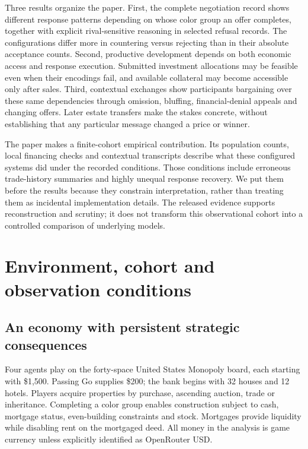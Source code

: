 Three results organize the paper. First, the complete negotiation record shows different response patterns depending on whose color group an offer completes, together with explicit rival-sensitive reasoning in selected refusal records. The configurations differ more in countering versus rejecting than in their absolute acceptance counts. Second, productive development depends on both economic access and response execution. Submitted investment allocations may be feasible even when their encodings fail, and available collateral may become accessible only after sales. Third, contextual exchanges show participants bargaining over these same dependencies through omission, bluffing, financial-denial appeals and changing offers. Later estate transfers make the stakes concrete, without establishing that any particular message changed a price or winner.

The paper makes a finite-cohort empirical contribution. Its population counts, local financing checks and contextual transcripts describe what these configured systems did under the recorded conditions. Those conditions include erroneous trade-history summaries and highly unequal response recovery. We put them before the results because they constrain interpretation, rather than treating them as incidental implementation details. The released evidence supports reconstruction and scrutiny; it does not transform this observational cohort into a controlled comparison of underlying models.

\section{Environment, cohort and observation conditions}
\label{sec:setup}

\subsection{An economy with persistent strategic consequences}

Four agents play on the forty-space United States Monopoly board, each starting with \$1,500. Passing Go supplies \$200; the bank begins with 32 houses and 12 hotels. Players acquire properties by purchase, ascending auction, trade or inheritance. Completing a color group enables construction subject to cash, mortgage status, even-building constraints and stock. Mortgages provide liquidity while disabling rent on the mortgaged deed. All money in the analysis is game currency unless explicitly identified as OpenRouter USD.

